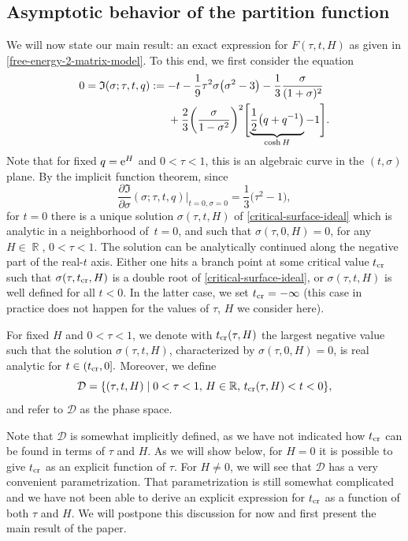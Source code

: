 \documentclass[pdftex]{sigma}
\DeclareMathOperator{\RR}{\mathbb{R}}
\numberwithin{equation}{section}
\begin{document}
\subsection{Asymptotic behavior of the partition function}
We will now state our main result: an exact expression for $F(\tau,t,H)$ as given in \eqref{free-energy-2-matrix-model}.
To this end, we first consider the equation
 \begin{align}
 0 = \mathfrak{I}(\sigma;\tau,t,q) :={}& {-}t -\frac{1}{9}\tau^2\sigma \bigl(\sigma^2 - 3\bigr) -\frac{1}{3}\frac{\sigma}{(1+\sigma)^2} \nonumber\\
 \hphantom{0 = \mathfrak{I}(\sigma;\tau,t,q) :=}{}
 &{} + \frac{2}{3}\biggl(\frac{\sigma}{1-\sigma^2}\biggr)^2\Biggl[\underbrace{\frac{1}{2}\bigl(q+q^{-1}\bigr)}_{\cosh H} -1\Biggr].\label{critical-surface-ideal}
 \end{align}
Note that for fixed $q={\rm e}^{H}$ and $0< \tau <1$, this is an algebraic curve in the $(t,\sigma)$ plane. By the implicit function theorem, since
 \begin{equation*}
 \frac{\partial \mathfrak{I}}{\partial \sigma}(\sigma;\tau,t,q)\big|_{t=0,\sigma=0} = \frac{1}{3}\bigl(\tau^2-1\bigr),
 \end{equation*}
for $t=0$ there is a unique solution $\sigma(\tau,t, H)$ of \eqref{critical-surface-ideal} which is analytic in a neighborhood of~${t=0}$, and such that $\sigma(\tau,0,H)=0$, for any $H\in \RR$, $0<\tau<1$. The solution can be analytically continued along the negative part of the real-$t$ axis. Either one hits a branch point at some critical value $t_{\rm cr}$ such that $\sigma(\tau,t_{\rm cr},H)$ is a double root of \eqref{critical-surface-ideal}, or $\sigma(\tau,t,H)$ is well defined for all $t<0$. In the latter case, we set $t_{\rm cr}=-\infty$ (this case in practice does not happen for the values of $\tau$, $H$ we consider here).
\begin{Definition} \label{def:sigmaDtcrx}
For fixed $H$ and $0<\tau <1$, we denote with $t_{\rm cr}(\tau,H)$ the largest negative value such that the solution $\sigma(\tau,t,H)$, characterized by $\sigma(\tau,0, H)=0$, is real analytic for $t\in (t_{\rm cr},0].$ Moreover, we define
\[
\mathcal D=\{(\tau,t,H) \mid 0<\tau<1,\, H \in \mathbb{R},\, t_{\rm cr}(\tau,H)< t <0\},
\]
and refer to $\mathcal{D}$ as the phase space.
\end{Definition}
Note that $\mathcal{D}$ is somewhat implicitly defined, as we have not indicated how $t_{\rm cr}$ can be found in terms of $\tau$ and $H$. As we will show below, for $H=0$ it is possible to give $t_{\rm cr}$ as an explicit function of $\tau$. For $H\neq 0$, we will see that $\mathcal D$ has a very convenient parametrization. That parametrization is still somewhat complicated and we have not been able to derive an explicit expression for $t_{\rm cr}$ as a function of both $\tau$ and $H$. We will postpone this discussion for now and first present the main result of the paper.
\end{document}
